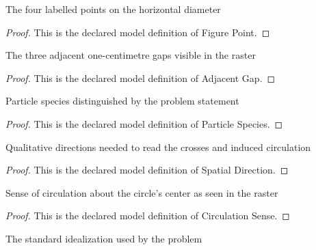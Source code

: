 \begin{definition}
  \label{def:physics:phyx-mini-0927:phyxminiproblems-problemphyxmini0927-figurepoint}
  The four labelled points on the horizontal diameter
\end{definition}
\begin{proof}
  This is the declared model definition of Figure Point.
\end{proof}
\begin{definition}
  \label{def:physics:phyx-mini-0927:phyxminiproblems-problemphyxmini0927-adjacentgap}
  The three adjacent one-centimetre gaps visible in the raster
\end{definition}
\begin{proof}
  This is the declared model definition of Adjacent Gap.
\end{proof}
\begin{definition}
  \label{def:physics:phyx-mini-0927:phyxminiproblems-problemphyxmini0927-particlespecies}
  Particle species distinguished by the problem statement
\end{definition}
\begin{proof}
  This is the declared model definition of Particle Species.
\end{proof}
\begin{definition}
  \label{def:physics:phyx-mini-0927:phyxminiproblems-problemphyxmini0927-spatialdirection}
  Qualitative directions needed to read the crosses and induced circulation
\end{definition}
\begin{proof}
  This is the declared model definition of Spatial Direction.
\end{proof}
\begin{definition}
  \label{def:physics:phyx-mini-0927:phyxminiproblems-problemphyxmini0927-circulationsense}
  Sense of circulation about the circle's center as seen in the raster
\end{definition}
\begin{proof}
  This is the declared model definition of Circulation Sense.
\end{proof}
\begin{definition}
  \label{def:physics:phyx-mini-0927:phyxminiproblems-problemphyxmini0927-magneticfieldmodel}
  The standard idealization used by the problem
\end{definition}
